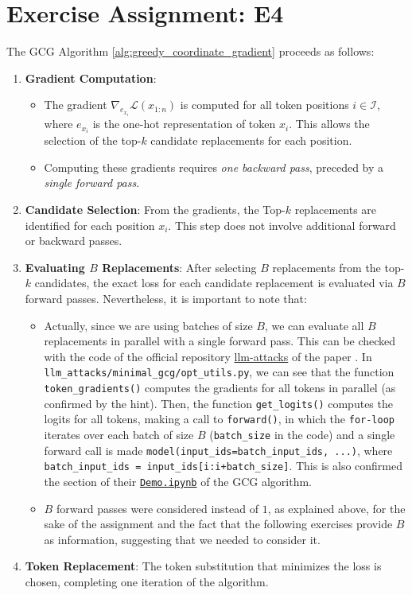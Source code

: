 \documentclass{article}
\begin{document}
\section{Exercise Assignment: E4}\label{sec:e4}
The GCG Algorithm \ref{alg:greedy_coordinate_gradient} proceeds as follows:
\begin{enumerate}
    \item \textbf{Gradient Computation}:
    \begin{itemize}
        \item The gradient \(\nabla_{e_{x_i}} \mathcal{L}(x_{1:n})\) is computed for all token positions \(i \in \mathcal{I}\), where \(e_{x_i}\) is the one-hot representation of token \(x_i\). This allows the selection of the top-\(k\) candidate replacements for each position.
        \item Computing these gradients requires \textit{one backward pass}, preceded by a \textit{single forward pass}.
    \end{itemize}
    \item \textbf{Candidate Selection}: From the gradients, the Top-\(k\) replacements are identified for each position \(x_i\). This step does not involve additional forward or backward passes.
    \item \textbf{Evaluating \(B\) Replacements}: After selecting \(B\) replacements from the top-\(k\) candidates, the exact loss for each candidate replacement is evaluated via \(B\) forward passes. Nevertheless, it is important to note that:
    \begin{itemize}
        \item Actually, since we are using batches of size \(B\), we can evaluate all \(B\) replacements in parallel with a single forward pass. This can be checked with the code of the official repository \href{https://github.com/llm-attacks/llm-attacks/tree/main}{llm-attacks} of the paper \cite{zou2023universaltransferableadversarialattacks}. In \texttt{llm\_attacks/minimal\_gcg/opt\_utils.py}, we can see that the function \texttt{token\_gradients()} computes the gradients for all tokens in parallel (as confirmed by the hint). Then, the function \texttt{get\_logits()} computes the logits for all tokens, making a call to \texttt{forward()}, in which the \texttt{for-loop} iterates over each batch of size $B$ (\texttt{batch\_size} in the code) and a single forward call is made \texttt{model(input\_ids=batch\_input\_ids, ...)}, where \texttt{batch\_input\_ids = input\_ids[i:i+batch\_size]}. This is also confirmed the section  of their \href{https://colab.research.google.com/drive/1dinZSyP1E4KokSLPcCh1JQFUFsN-WV--?usp=sharing#scrollTo=26abc77f}{\texttt{Demo.ipynb}} of the GCG algorithm.
        \item $B$ forward passes were considered instead of $1$, as explained above, for the sake of the assignment and the fact that the following exercises provide $B$ as information, suggesting that we needed to consider it.
    \end{itemize}
    \item \textbf{Token Replacement}: The token substitution that minimizes the loss is chosen, completing one iteration of the algorithm.
\end{enumerate}
\end{document}
